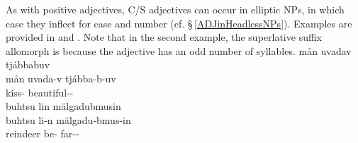 As with positive adjectives, C/S adjectives can occur in elliptic NPs, in which case they inflect for case and number (cf. §\,\ref{ADJinHeadlessNPs}). Examples are provided in  and . Note that in the second example, the superlative suffix allomorph is  because the adjective has an odd number of syllables.
\ea\label{compATTRADJex2}%
\glll	mån uvadav tjábbabuv\\
	mån uvada-v tjábba-b-uv\\
	 kiss- beautiful--\\\nopagebreak
{}	
\z
\ea\label{superlATTRADJex2}
\glll	buhtsu lin mälgadubmusin\\
	buhtsu li-n mälgadu-bmus-in\\
	reindeer\BS{} be- far--\\\nopagebreak
{}	%
\z


